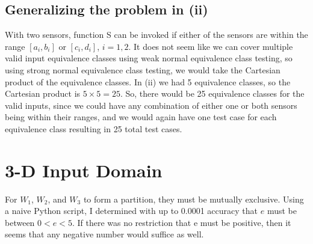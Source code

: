 \documentclass[letterpaper]{article}
\begin{document}
\subsection{Generalizing the problem in (ii)}
With two sensors, function S can be invoked if either of the sensors are within
the range $[a_i, b_i]$ or $[c_i, d_i]$, $i=1,2$. 
It does not seem like we can cover multiple valid input equivalence classes
using weak normal equivalence class testing, so using strong normal equivalence 
class testing, we would take the Cartesian product of the equivalence classes. 
In (ii) we had 5 equivalence classes, so the Cartesian product is 
$5 \times 5 = 25$. So, there would be 25 equivalence classes for the valid
inputs, since we could have any combination of either one or both sensors being
within their ranges, and we would again have one test case for each equivalence
class resulting in 25 total test cases.

\section{3-D Input Domain}
For $W_1$, $W_2$, and $W_3$ to form a partition, they must be mutually
exclusive. Using a naive Python script, I determined with up to 0.0001 accuracy
that $e$ must be between $0 < e < 5$. If there was no restriction that e
must be positive, then it seems that any negative number would suffice as well.
\end{document}
